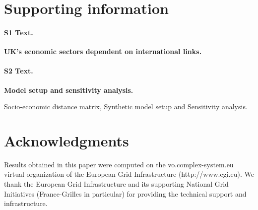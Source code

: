 \documentclass[10pt,letterpaper]{article}
\begin{document}
\section*{Supporting information}

\paragraph*{S1 Text.}
\label{S1_Text}
{\bf UK's economic sectors dependent on international links.}

\paragraph*{S2 Text.}
\label{S2_Text}
{\bf Model setup and sensitivity analysis.}

Socio-economic distance matrix, Synthetic model setup and Sensitivity analysis.



\section*{Acknowledgments}

Results obtained in this paper were computed on the vo.complex-system.eu virtual organization of the European Grid Infrastructure (http://www.egi.eu). We thank the European Grid Infrastructure and its supporting National Grid Initiatives (France-Grilles in particular) for providing the technical support and infrastructure.




\end{document}
